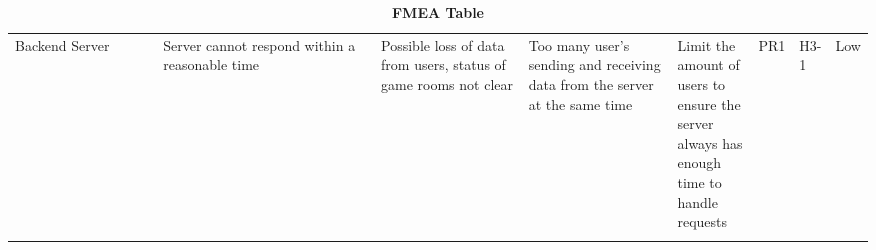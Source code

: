 \documentclass{article}
\begin{document}
\begin{table}[H]
\begin{adjustbox}{width=(/5)}
\begin{tabular}{|p{0.20\linewidth} | p{0.30\linewidth} | p{0.20\linewidth}|  p{0.20\linewidth}|  p{0.30\linewidth}|  p{0.07\linewidth}|  p{0.07\linewidth}|p{0.12\linewidth}| }
          \hline
          Backend Server                   &    Server cannot respond within a reasonable time         &     Possible loss of data from users, status of game rooms not clear    &    Too many user's sending and receiving data from the server at the same time    &     Limit the amount of users to ensure the server always has enough time to handle requests      &   PR1          &  H3-1            &      Low            \\
                                   &                        &                             &                            &                             &             &              &                  \\
          \hline
    \end{tabular}
    \end{adjustbox}
    \caption{\bf FMEA Table}
    \label{tab:FMEA1}
\end{table}
\end{document}
